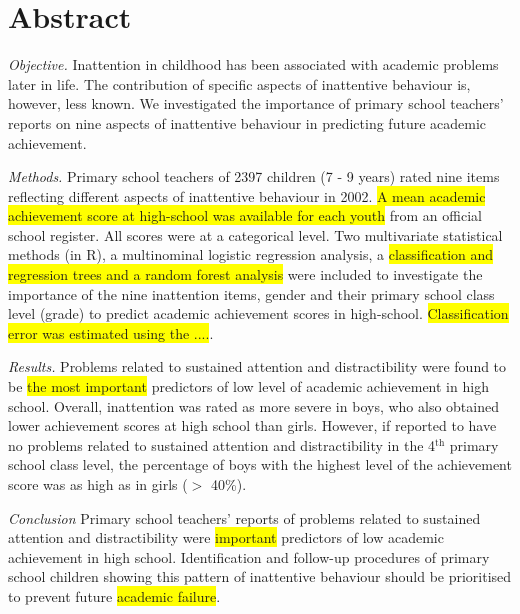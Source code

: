 \documentclass[10pt,letterpaper]{article}
\begin{document}
\section*{Abstract}
\noindent \emph{Objective.}
Inattention in childhood has been associated with academic problems later in life. The contribution of specific aspects of inattentive behaviour is, however, less known. We investigated the importance of primary school teachers' reports on nine aspects of inattentive behaviour in predicting future academic achievement. 

\noindent \emph{Methods.} Primary school teachers of 2397 children (7 - 9 years) rated nine items reflecting different aspects of inattentive behaviour in 2002. \colorbox{yellow}{A mean academic achievement score at high-school was available for each youth} from an official school register. All scores were at a categorical level. Two multivariate statistical methods (in R), a multinominal logistic regression analysis,  a \colorbox{yellow}{classification and regression trees and a random forest analysis} were included to investigate 
the importance  of the nine inattention items, gender and their primary school class level (grade) to predict academic achievement scores in high-school. \colorbox{yellow}{Classification error was estimated using the ....}.

\noindent \emph{Results.}
Problems related to sustained attention and distractibility were found to be \colorbox{yellow}{the most important} predictors of low level of academic achievement in high school. Overall, inattention was rated as more severe in boys, who also obtained lower achievement scores at high school than girls. However, if reported to have no problems related to sustained attention and distractibility in the 4$^{\text{th}}$ primary school class level, the percentage of boys with the highest level of the achievement score was as high as in girls ($>$ 40\%). 

\noindent \emph{Conclusion} 
Primary school teachers' reports of problems related to sustained attention and distractibility were \colorbox{yellow}{important} predictors of low academic achievement in high school.  Identification and follow-up procedures of primary school children showing this pattern of inattentive behaviour should be prioritised to prevent future \colorbox{yellow}{academic failure}. %


\end{document}
